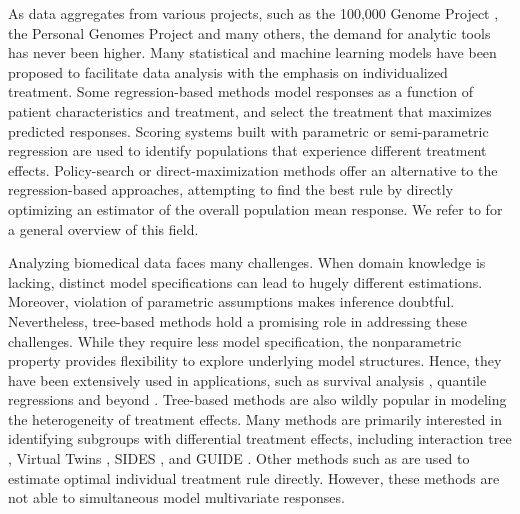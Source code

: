 \documentclass[smallextended]{svjour3}
\begin{document}
As data aggregates from various projects, such as the 100,000 Genome Project \citep{Peplowi1757}, the Personal Genomes Project \citep{ball2014harvard} and many others, the demand for analytic tools has never been higher. Many statistical and machine learning models have been proposed to facilitate data analysis with the emphasis on individualized treatment. Some regression-based methods \citep{Brinkley2010,qian2011performance} model responses as a function of patient characteristics and treatment, and select the treatment that maximizes predicted responses. Scoring systems built with parametric or semi-parametric regression\citep{Cai2011, Zhao2013} are used to identify populations that experience different treatment effects. Policy-search or direct-maximization methods \citep{Zhang2012,zhang2012robust, Zhao2012, Zhang2013} offer an alternative to the regression-based approaches, attempting to find the best rule by directly optimizing an estimator of the overall population mean response. We refer to \citep{kosorok2015adaptive} for a general overview of this field. 

Analyzing biomedical data faces many challenges. When domain knowledge is lacking, distinct model specifications can lead to hugely different estimations. Moreover, violation of parametric assumptions makes inference doubtful. Nevertheless, tree-based methods hold a promising role in addressing these challenges. While they require less model specification, the nonparametric property provides flexibility to explore underlying model structures. Hence, they have been extensively used in applications, such as survival analysis \citep{gordon1985tree, leblanc1992relative, hothorn2005survival, ishwaran2008random, zhu2012recursively}, quantile regressions \citep{meinshausen2006quantile} and beyond \citep{athey2019generalized}. Tree-based methods are also wildly popular in modeling the heterogeneity of treatment effects. Many methods are primarily interested in identifying subgroups with differential treatment effects, including interaction tree \citep{Su2009}, Virtual Twins \citep{Foster2011a}, SIDES \citep{Lipkovich2011}, and GUIDE \citep{Loh2015}. Other methods such as \citep{Zhang2012,Laber2015a,Zhang2015a,athey2016recursive,Zhu2017} are used to estimate optimal individual treatment rule directly. However, these methods are not able to simultaneous model multivariate responses.
\end{document}
